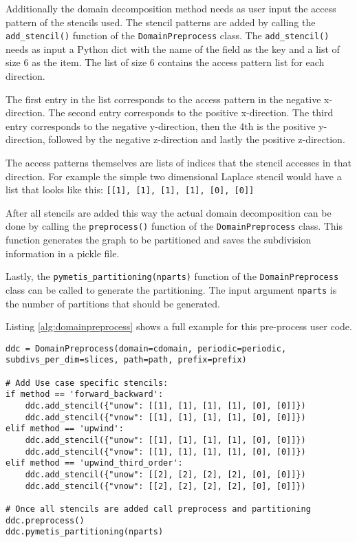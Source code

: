 Additionally the domain decomposition method needs as user input the access pattern of the stencils used.
The stencil patterns are added by calling the \texttt{add\_stencil()} function of the \texttt{DomainPreprocess} class.
The \texttt{add\_stencil()} needs as input a Python dict with the name of the field as the key and a list of size 6 as the item.
The list of size 6 contains the access pattern list for each direction.

The first entry in the list corresponds to the access pattern in the negative x-direction.
The second entry corresponds to the positive x-direction.
The third entry corresponds to the negative y-direction, then the 4th is the positive y-direction, followed by the negative z-direction and lastly the positive z-direction.

The access patterns themselves are lists of indices that the stencil accesses in that direction.
For example the simple two dimensional Laplace stencil would have a list that looks like this: \texttt{[[1], [1], [1], [1], [0], [0]]}

After all stencils are added this way the actual domain decomposition can be done by calling the \texttt{preprocess()} function of the \texttt{DomainPreprocess} class.
This function generates the graph to be partitioned and saves the subdivision information in a pickle file.

Lastly, the \texttt{pymetis\_partitioning(nparts)} function of the \texttt{DomainPreprocess} class can be called to generate the partitioning. The input argument \texttt{nparts} is the number of partitions that should be generated.

Listing \ref{alg:domainpreprocess} shows a full example for this pre-process user code.

\begin{lstlisting}[caption={Example code of the domain pre-process function calls and additional information needed to decompose a domain.},captionpos=b, label={alg:domainpreprocess}, float, floatplacement=H]
ddc = DomainPreprocess(domain=cdomain, periodic=periodic, subdivs_per_dim=slices, path=path, prefix=prefix)

# Add Use case specific stencils:
if method == 'forward_backward':
    ddc.add_stencil({"unow": [[1], [1], [1], [1], [0], [0]]})
    ddc.add_stencil({"vnow": [[1], [1], [1], [1], [0], [0]]})
elif method == 'upwind':
    ddc.add_stencil({"unow": [[1], [1], [1], [1], [0], [0]]})
    ddc.add_stencil({"vnow": [[1], [1], [1], [1], [0], [0]]})
elif method == 'upwind_third_order':
    ddc.add_stencil({"unow": [[2], [2], [2], [2], [0], [0]]})
    ddc.add_stencil({"vnow": [[2], [2], [2], [2], [0], [0]]})

# Once all stencils are added call preprocess and partitioning
ddc.preprocess()
ddc.pymetis_partitioning(nparts)
\end{lstlisting}

